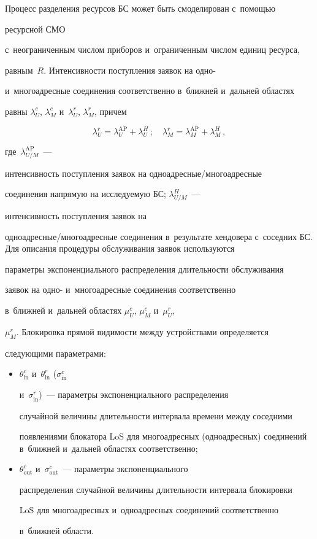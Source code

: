   Процесс разделения ресурсов БС может быть смоделирован с~по\-мощью 

ресурсной СМО~\cite{15-gai-1} 

с~неограниченным чис\-лом приборов и~ограниченным чис\-лом единиц ресурса, 

рав\-ным~$R$. Интенсивности по\-ступ\-ле\-ния заявок на одно- 

и~многоадресные соединения соответственно в~ближ\-ней и~даль\-ней областях 

рав\-ны $\lambda_U^c$, $\lambda_M^c$ и~$\lambda_U^r$, $\lambda_M^r$, причем 

$$

\lambda_U^r= \lambda_U^{\mathrm{AP}} + \lambda_U^H\,;\quad

\lambda_M^r=  \lambda_M^{\mathrm{AP}} +\lambda_M^H\,,

$$

 где~$\lambda^{\mathrm{AP}}_{U/M}$~--- 

ин\-тен\-сив\-ность по\-ступ\-ле\-ния заявок на од\-но\-ад\-рес\-ные\!/\!мно\-го\-ад\-рес\-ные 

со\-еди\-не\-ния на\-пря\-мую на ис\-сле\-ду\-емую БС; $\lambda_{U/M}^H$~--- 

ин\-тен\-сив\-ность по\-ступ\-ле\-ния заявок на  

од\-но\-ад\-рес\-ные\!/\!мно\-го\-ад\-рес\-ные со\-еди\-не\-ния в~результате хендовера с~соседних БС. Для описания процедуры обслуживания заявок используются 

па\-ра\-мет\-ры экспоненциального распределения длительности обслуживания 

заявок на одно- и~многоадресные соединения соответственно 

в~ближ\-ней и~дальней областях $\mu_U^c$, $\mu_M^c$ и~$\mu_U^r$, 

$\mu_M^r$. Блокировка прямой ви\-ди\-мости между устройствами определяется 

сле\-ду\-ющи\-ми па\-ра\-мет\-рами:

  \begin{itemize}

\item $\theta^c_{\mathrm{in}}$ и~$\theta^r_{\mathrm{in}}$ ($\sigma^c_{\mathrm{in}}$  

и~$\sigma^r_{\mathrm{in}}$)~--- па\-ра\-мет\-ры экспоненциального распределения 

случайной величины дли\-тель\-ности интервала времени между соседними 

появлениями блокатора LoS для многоадресных (одноадресных) соединений в~ближ\-ней и~дальней областях соответственно;

\item $\theta^c_{\mathrm{out}}$ и~$\sigma^c_{\mathrm{out}}$~--- параметры экспоненциального 

распределения случайной величины дли\-тель\-ности интервала блокировки 

LoS для многоадресных и~одноадресных со\-еди\-не\-ний соответственно 

в~ближ\-ней об\-ласти.

\end{itemize}



